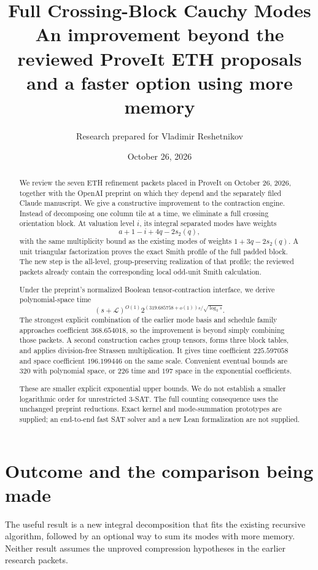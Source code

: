 \documentclass[11pt,letterpaper]{article}
\title{\textbf{Full Crossing-Block Cauchy Modes}\\[4pt]
\large An improvement beyond the reviewed ProveIt ETH proposals\\
and a faster option using more memory}
\author{Research prepared for Vladimir Reshetnikov}
\date{October 26, 2026}
\theoremstyle{definition}\newtheorem{definition}[theorem]{Definition}
\theoremstyle{remark}\newtheorem{remark}[theorem]{Remark}
\begin{document}
\maketitle
\begin{abstract}
We review the seven ETH refinement packets placed in ProveIt on October 26,
2026, together with the OpenAI preprint on which they depend and the separately
filed Claude manuscript. We give a constructive improvement to the contraction
engine. Instead of decomposing one column tile at a time, we eliminate a full
crossing orientation block. At valuation level $i$, its integral separated
modes have weights
\[
 a+1-i+4q-2s_2(q),
\]
with the same multiplicity bound as the existing modes of weights
$1+3q-2s_2(q)$. A unit triangular factorization proves the exact Smith profile
of the full padded block. The new step is the all-level, group-preserving
realization of that profile; the reviewed packets already contain the
corresponding local odd-unit Smith calculation.

Under the preprint's normalized Boolean tensor-contraction interface, we
derive polynomial-space time
\[
 (s+\mathcal L)^{O(1)}
 2^{(319.685758+o(1))s/\sqrt{\log_2s}}.
\]
The strongest explicit combination of the earlier mode basis and schedule
family approaches coefficient $368.654018$, so the improvement is beyond
simply combining those packets. A second construction caches group tensors,
forms three block tables, and applies division-free Strassen multiplication.
It gives time coefficient $225.597058$ and space coefficient $196.199446$ on
the same scale. Convenient eventual bounds are $320$ with polynomial space,
or $226$ time and $197$ space in the exponential coefficients.

These are smaller explicit exponential upper bounds. We do not establish a
smaller logarithmic order for unrestricted 3-SAT. The full counting consequence
uses the unchanged preprint reductions. Exact kernel and mode-summation
prototypes are supplied; an end-to-end fast SAT solver and a new Lean
formalization are not supplied.
\end{abstract}
\clearpage
\tableofcontents
\clearpage

\section{Outcome and the comparison being made}
\label{sec:outcome}

The useful result is a new integral decomposition that fits the existing
recursive algorithm, followed by an optional way to sum its modes with more
memory. Neither result assumes the unproved compression hypotheses in the
earlier research packets.
\end{document}
